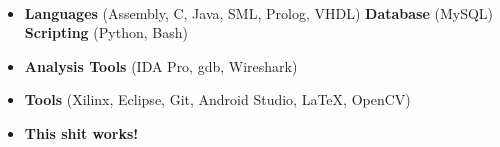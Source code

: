 \\[\lsep]

\begin{itemize}

	\itemsep-0.25em
	\item \noindent \textbf{Languages} (Assembly, C, Java, SML, Prolog, VHDL) \textbf{Database} (MySQL) \textbf{Scripting} (Python, Bash)
	\item \noindent \textbf{Analysis Tools} (IDA Pro, gdb, Wireshark)
	\item \noindent \textbf{Tools} (Xilinx, Eclipse, Git, Android Studio, \LaTeX, OpenCV)
	\item \noindent \textbf{This shit works!}

\end{itemize}
